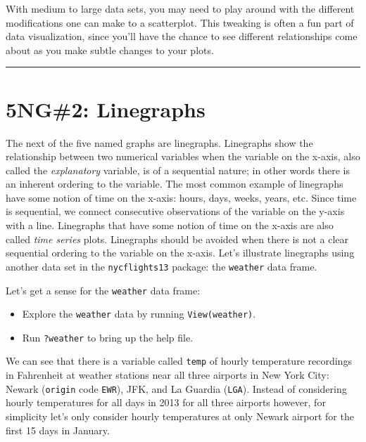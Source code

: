\documentclass[12pt, krantz2,]{krantz}
\providecommand{\tightlist}{%
  \setlength{\itemsep}{0pt}\setlength{\parskip}{0pt}}
\begin{document}
With medium to large data sets, you may need to play around with the different modifications one can make to a scatterplot. This tweaking is often a fun part of data visualization, since you'll have the chance to see different relationships come about as you make subtle changes to your plots.

\begin{center}\rule{0.5\linewidth}{\linethickness}\end{center}

\hypertarget{linegraphs}{%
\section{5NG\#2: Linegraphs}\label{linegraphs}}

The next of the five named graphs are linegraphs. Linegraphs show the relationship between two numerical variables when the variable on the x-axis, also called the \emph{explanatory} variable, is of a sequential nature; in other words there is an inherent ordering to the variable. The most common example of linegraphs have some notion of time on the x-axis: hours, days, weeks, years, etc. Since time is sequential, we connect consecutive observations of the variable on the y-axis with a line. Linegraphs that have some notion of time on the x-axis are also called \emph{time series} plots. Linegraphs should be avoided when there is not a clear sequential ordering to the variable on the x-axis. Let's illustrate linegraphs using another data set in the \texttt{nycflights13} package: the \texttt{weather} data frame.

Let's get a sense for the \texttt{weather} data frame:

\begin{itemize}
\tightlist
\item
  Explore the \texttt{weather} data by running \texttt{View(weather)}.
\item
  Run \texttt{?weather} to bring up the help file.
\end{itemize}

We can see that there is a variable called \texttt{temp} of hourly temperature recordings in Fahrenheit at weather stations near all three airports in New York City: Newark (\texttt{origin} code \texttt{EWR}), JFK, and La Guardia (\texttt{LGA}). Instead of considering hourly temperatures for all days in 2013 for all three airports however, for simplicity let's only consider hourly temperatures at only Newark airport for the first 15 days in January.
\end{document}
